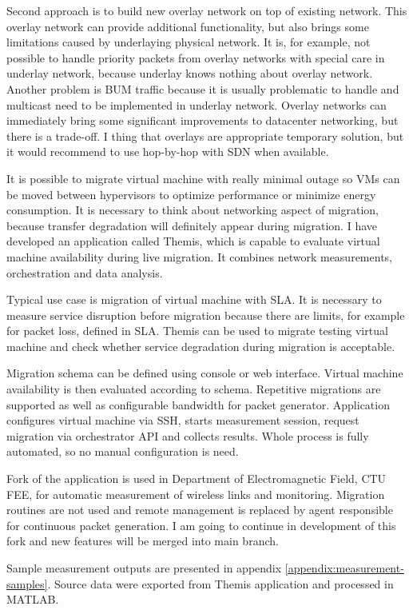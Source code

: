 Second approach is to build new overlay network on top of existing network. This overlay network can provide additional functionality, but also brings some limitations caused by underlaying physical network. It is, for example, not possible to handle priority packets from overlay networks with special care in underlay network, because underlay knows nothing about overlay network. Another problem is \Ac{BUM} traffic because it is usually problematic to handle and multicast need to be implemented in underlay network.
Overlay networks can immediately bring some significant improvements to datacenter networking, but there is a trade-off. I thing that overlays are appropriate temporary solution, but it would recommend to use hop-by-hop with \Ac{SDN} when available.

It is possible to migrate virtual machine with really minimal outage so \Ac{VM}s can be moved between hypervisors to optimize performance or minimize energy consumption. It is necessary to think about networking aspect of migration, because transfer degradation will definitely appear during migration. I have developed an application called Themis, which is capable to evaluate virtual machine availability during live migration. It combines network measurements, orchestration and data analysis.

Typical use case is migration of virtual machine with \Ac{SLA}. It is necessary to measure service disruption before migration because there are limits, for example for packet loss, defined in \Ac{SLA}. Themis can be used to migrate testing virtual machine and check whether service degradation during migration is acceptable.

Migration schema can be defined using console or web interface. Virtual machine availability is then evaluated according to schema. Repetitive migrations are supported as well as configurable bandwidth for packet generator. 
Application configures virtual machine via \Ac{SSH}, starts measurement session, request migration via orchestrator \Ac{API} and collects results. Whole process is fully automated, so no manual configuration is need. 





Fork of the application is used in Department of Electromagnetic Field, CTU FEE, for automatic measurement of wireless links and monitoring. Migration routines are not used and remote management is replaced by agent responsible for continuous packet generation. I am going to continue in development of this fork and new features will be merged into main branch.


Sample measurement outputs are presented in appendix \ref{appendix:measurement-samples}. Source data were exported from Themis application and processed in MATLAB.
